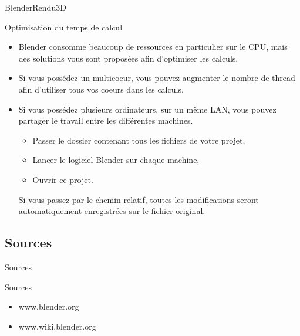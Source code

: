 \documentclass{beamer}
\begin{document}
\begin{frame}{Blender}{Rendu3D}
    \begin{block}{Optimisation du temps de calcul}
    \begin{itemize}
        \item{
            Blender consomme beaucoup de ressources en particulier sur le CPU, mais des solutions vous sont proposées afin d'optimiser les calculs.
        }    
        \\
        \item{
            Si vous possédez un multicoeur, vous pouvez augmenter le nombre de thread afin d'utiliser tous vos coeurs dans les calculs.
        }
        \\
        \item{
            Si vous possédez plusieurs ordinateurs, sur un même LAN, vous pouvez partager le travail entre les différentes machines.\\
          \begin{itemize}
          \item Passer le dossier contenant tous les fichiers de votre projet,
          \item Lancer le logiciel Blender sur chaque machine,
          \item Ouvrir ce projet.
          \end{itemize}  
            
            Si vous passez par le chemin relatif, toutes les modifications seront automatiquement enregistrées sur le fichier original.
        }
    \end{itemize}
    \end{block}
\end{frame}



\subsection{Sources}

\begin{frame}{Sources}
    \begin{block}{Sources}
    \begin{itemize}

        \item{   www.blender.org }
        \item{   www.wiki.blender.org }

    \end{itemize}
        \end{block}

    
\end{frame}


\end{document}
